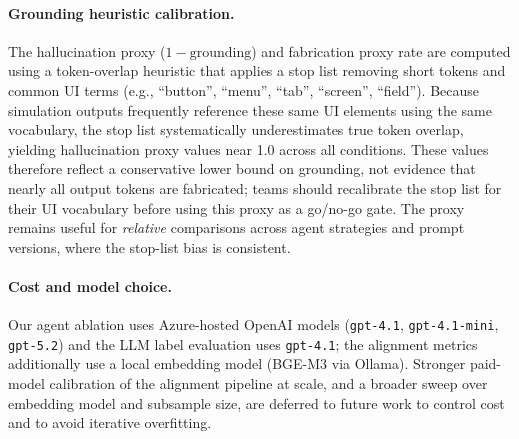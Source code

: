 \paragraph{Grounding heuristic calibration.}
The hallucination proxy ($1-\text{grounding}$) and fabrication proxy rate are computed using a token-overlap heuristic that applies a stop list removing short tokens and common UI terms (e.g., ``button'', ``menu'', ``tab'', ``screen'', ``field'').
Because simulation outputs frequently reference these same UI elements using the same vocabulary, the stop list systematically underestimates true token overlap, yielding hallucination proxy values near 1.0 across all conditions.
These values therefore reflect a conservative lower bound on grounding, not evidence that nearly all output tokens are fabricated; teams should recalibrate the stop list for their UI vocabulary before using this proxy as a go/no-go gate.
The proxy remains useful for \emph{relative} comparisons across agent strategies and prompt versions, where the stop-list bias is consistent.

\paragraph{Cost and model choice.}
Our agent ablation uses Azure-hosted OpenAI models (\texttt{gpt-4.1}, \texttt{gpt-4.1-mini}, \texttt{gpt-5.2}) and the LLM label evaluation uses \texttt{gpt-4.1}; the alignment metrics additionally use a local embedding model (BGE-M3 via Ollama). Stronger paid-model calibration of the alignment pipeline at scale, and a broader sweep over embedding model and subsample size, are deferred to future work to control cost and to avoid iterative overfitting.
